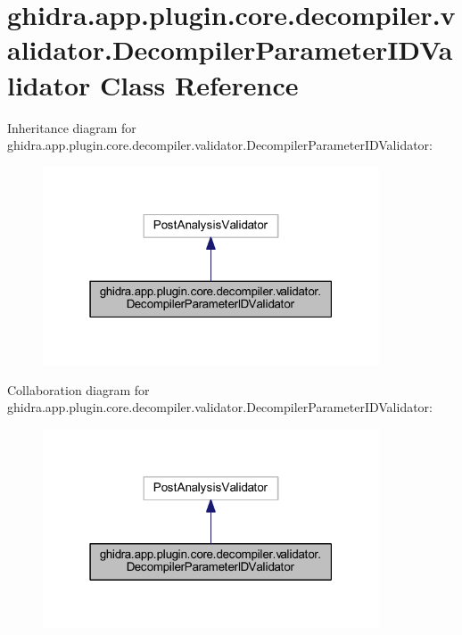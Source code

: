 \hypertarget{classghidra_1_1app_1_1plugin_1_1core_1_1decompiler_1_1validator_1_1_decompiler_parameter_i_d_validator}{}\section{ghidra.\+app.\+plugin.\+core.\+decompiler.\+validator.\+Decompiler\+Parameter\+I\+D\+Validator Class Reference}
\label{classghidra_1_1app_1_1plugin_1_1core_1_1decompiler_1_1validator_1_1_decompiler_parameter_i_d_validator}


Inheritance diagram for ghidra.\+app.\+plugin.\+core.\+decompiler.\+validator.\+Decompiler\+Parameter\+I\+D\+Validator\+:
\nopagebreak
\begin{figure}[H]
\begin{center}
\leavevmode
\includegraphics[width=283pt]{classghidra_1_1app_1_1plugin_1_1core_1_1decompiler_1_1validator_1_1_decompiler_parameter_i_d_validator__inherit__graph}
\end{center}
\end{figure}


Collaboration diagram for ghidra.\+app.\+plugin.\+core.\+decompiler.\+validator.\+Decompiler\+Parameter\+I\+D\+Validator\+:
\nopagebreak
\begin{figure}[H]
\begin{center}
\leavevmode
\includegraphics[width=283pt]{classghidra_1_1app_1_1plugin_1_1core_1_1decompiler_1_1validator_1_1_decompiler_parameter_i_d_validator__coll__graph}
\end{center}
\end{figure}
